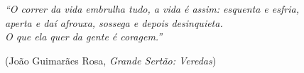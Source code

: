 \documentclass[12pt,a4paper,openany]{report}
\begin{document}
\itacapa
{}
\itafolhaderosto
\ifdefined\itapreliminar\setcounter{page}{2}\else{}\itaverso\fi
{}
\itafolhadeaprovacao
{}


\thispagestyle{itatg}
\null\vfill
\begin{otherlanguage}{brazilian}
\begin{flushright}\begin{minipage}{0.85\textwidth}\raggedleft\itshape\frenchspacing
``O correr da vida embrulha tudo, a vida é assim: esquenta e esfria,\\
aperta e daí afrouxa, sossega e depois desinquieta.\\
O que ela quer da gente é coragem.''\par
\upshape (João Guimarães Rosa, \emph{Grande Sertão: Veredas})
\end{minipage}\end{flushright}
\end{otherlanguage}
\vspace*{1.5cm}
\clearpage
\end{document}
